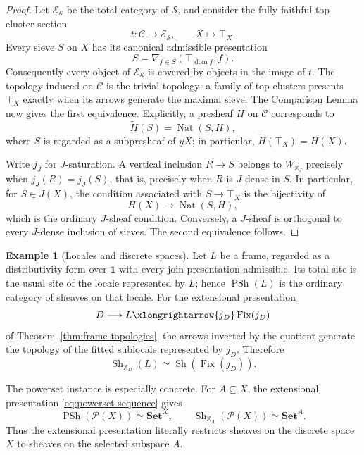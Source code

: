 \documentclass[12pt,oneside,reqno]{amsart}
\theoremstyle{definition}
\newtheorem{example}[theorem]{Example}
\theoremstyle{remark}
\newcommand{\C}{\mathcal C}
\newcommand{\Sieve}{\mathscr S}
\begin{document}
\begin{proof}
Let \(\mathcal E_{\Sieve}\) be the total category of \(\Sieve\), and
consider the fully faithful top-cluster section
\[
 t:\C\longrightarrow\mathcal E_{\Sieve},
 \qquad X\longmapsto\top_X.
\]
Every sieve \(S\) on \(X\) has its canonical admissible presentation
\[
             S=\nabla_{f\in S}
               (\top_{\operatorname{dom}f},f).
\]
Consequently every object of \(\mathcal E_{\Sieve}\) is covered by
objects in the image of \(t\).  The topology induced on \(\C\) is the
trivial topology: a family of top clusters presents \(\top_X\) exactly
when its arrows generate the maximal sieve.  The Comparison Lemma
\cite[Chapter~III, Section~4]{MacLaneMoerdijk} now gives the first
equivalence.  Explicitly, a presheaf \(H\) on \(\C\) corresponds to
\[
                       \widetilde H(S)
                          =\operatorname{Nat}(S,H),
\]
where \(S\) is regarded as a subpresheaf of \(yX\); in particular,
\(\widetilde H(\top_X)=H(X)\).

Write \(j_J\) for \(J\)-saturation.  A vertical inclusion
\(R\to S\) belongs to \(W_{\mathbb X_J}\) precisely when
\(j_J(R)=j_J(S)\), that is, precisely when \(R\) is \(J\)-dense in
\(S\).  In particular, for \(S\in J(X)\), the condition associated
with \(S\to\top_X\) is the bijectivity of
\[
                 H(X)\longrightarrow\operatorname{Nat}(S,H),
\]
which is the ordinary \(J\)-sheaf condition.  Conversely, a
\(J\)-sheaf is orthogonal to every \(J\)-dense inclusion of sieves.
The second equivalence follows.
\end{proof}

\begin{example}[Locales and discrete spaces]\label{ex:relative-locale-sheaves}
Let \(L\) be a frame, regarded as a distributivity form over
\(\mathbf1\) with every join presentation admissible.  Its total site
is the usual site of the locale represented by \(L\); hence
\(\operatorname{PSh}(L)\) is the ordinary category of sheaves on that
locale.  For the extensional presentation
\[
       D\longrightarrow L
        \xlongrightarrow{j_D}\operatorname{Fix}(j_D)
\]
of Theorem~\ref{thm:frame-topologies}, the arrows inverted by the
quotient generate the topology of the fitted sublocale represented by
\(j_D\).  Therefore
\[
       \operatorname{Sh}_{\mathbb X_D}(L)\simeq
       \operatorname{Sh}(\operatorname{Fix}(j_D)).
\]

The powerset instance is especially concrete.  For \(A\subseteq X\),
the extensional presentation \eqref{eq:powerset-sequence} gives
\[
       \operatorname{PSh}(\mathcal P(X))\simeq\mathbf{Set}^{X},
       \qquad
       \operatorname{Sh}_{\mathbb X_A}(\mathcal P(X))
          \simeq\mathbf{Set}^{A}.
\]
Thus the extensional presentation literally restricts sheaves on the
discrete space \(X\) to sheaves on the selected subspace \(A\).
\end{example}
\end{document}
